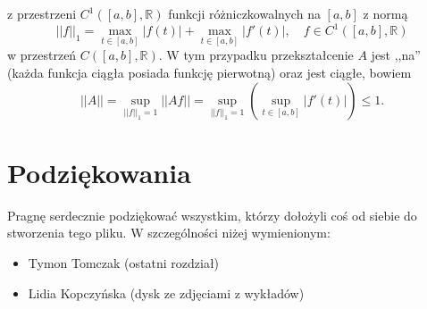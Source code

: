 \documentclass[leqno]{article}
\begin{document}
\begin{justify}
\begin{ex}
\begin{itemize}
            z przestrzeni $C^1([a,b], \mathbb{R})$ funkcji różniczkowalnych na $[a,b]$ z normą 
            \[
                ||f||_1 = \max_{t \in [a,b]}|f(t)| + \max_{t \in [a,b]}|f'(t)|, \quad f \in C^1([a,b], \mathbb{R})
            \]
            w przestrzeń $C([a,b], \mathbb{R})$. W tym przypadku przekształcenie $A$ jest ,,na'' (każda funkcja ciągła
            posiada funkcję pierwotną) oraz jest ciągłe, bowiem 
            \[
                ||A|| = \sup_{||f||_1 = 1}||Af|| = \sup_{||f||_1 = 1}(\sup_{t \in [a,b]}|f'(t)|) \leqslant 1.
            \]
    \end{itemize}
\end{ex}

\section*{Podziękowania}

Pragnę serdecznie podziękować wszystkim, którzy dołożyli coś od siebie do stworzenia tego pliku. W szczególności niżej wymienionym:
\begin{itemize}
    \item Tymon Tomczak (ostatni rozdział)
    \item Lidia Kopczyńska (dysk ze zdjęciami z wykładów)
\end{itemize}


\end{justify}
\end{document}
